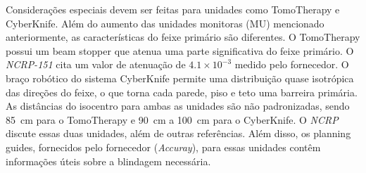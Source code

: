 \documentclass[11pt,a4paper]{article}
\begin{document}
	Considerações especiais devem ser feitas para unidades como TomoTherapy e CyberKnife. Além do aumento das unidades monitoras (MU) mencionado anteriormente, as características do feixe primário são diferentes. O TomoTherapy possui um beam stopper que atenua uma parte significativa do feixe primário. O \textit{NCRP-151} cita um valor de atenuação de $4.1 \times 10^{-3}$ medido pelo fornecedor. O braço robótico do sistema CyberKnife permite uma distribuição quase isotrópica das direções do feixe, o que torna cada parede, piso e teto uma barreira primária. As distâncias do isocentro para ambas as unidades são não padronizadas, sendo \SI{85}{\centi\meter} para o TomoTherapy e \SI{90}{\centi\meter} a \SI{100}{\centi\meter} para o CyberKnife. O \textit{NCRP} discute essas duas unidades, além de outras referências. Além disso, os planning guides, fornecidos pelo fornecedor (\textit{Accuray}), para essas unidades contêm informações úteis sobre a blindagem necessária.
\end{document}
